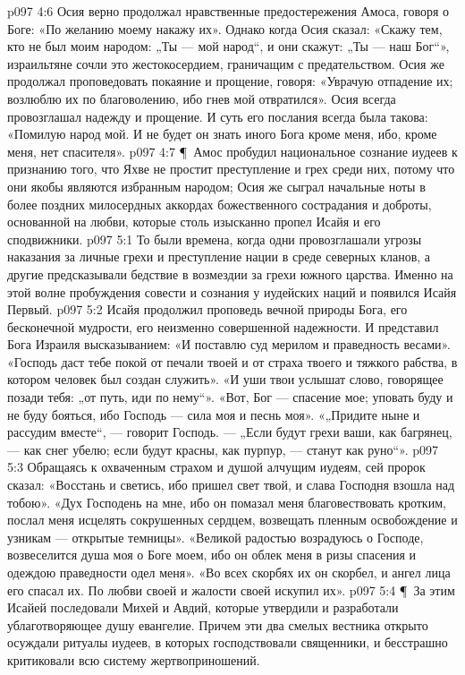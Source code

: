 \vs p097 4:6 Осия верно продолжал нравственные предостережения Амоса, говоря о Боге: «По желанию моему накажу их». Однако когда Осия сказал: «Скажу тем, кто не был моим народом: „Ты --- мой народ“, и они скажут: „Ты --- наш Бог“», израильтяне сочли это жестокосердием, граничащим с предательством. Осия же продолжал проповедовать покаяние и прощение, говоря: «Уврачую отпадение их; возлюблю их по благоволению, ибо гнев мой отвратился». Осия всегда провозглашал надежду и прощение. И суть его послания всегда была такова: «Помилую народ мой. И не будет он знать иного Бога кроме меня, ибо, кроме меня, нет спасителя».
\vs p097 4:7 \P\ Амос пробудил национальное сознание иудеев к признанию того, что Яхве не простит преступление и грех среди них, потому что они якобы являются избранным народом; Осия же сыграл начальные ноты в более поздних милосердных аккордах божественного сострадания и доброты, основанной на любви, которые столь изысканно пропел Исайя и его сподвижники.
\vs p097 5:1 То были времена, когда одни провозглашали угрозы наказания за личные грехи и преступление нации в среде северных кланов, а другие предсказывали бедствие в возмездии за грехи южного царства. Именно на этой волне пробуждения совести и сознания у иудейских наций и появился Исайя Первый.
\vs p097 5:2 Исайя продолжил проповедь вечной природы Бога, его бесконечной мудрости, его неизменно совершенной надежности. И представил Бога Израиля высказыванием: «И поставлю суд мерилом и праведность весами». «Господь даст тебе покой от печали твоей и от страха твоего и тяжкого рабства, в котором человек был создан служить». «И уши твои услышат слово, говорящее позади тебя: „от путь, иди по нему“». «Вот, Бог --- спасение мое; уповать буду и не буду бояться, ибо Господь --- сила моя и песнь моя». «„Придите ныне и рассудим вместе“, --- говорит Господь. --- „Если будут грехи ваши, как багрянец, --- как снег убелю; если будут красны, как пурпур, --- станут как руно“».
\vs p097 5:3 Обращаясь к охваченным страхом и душой алчущим иудеям, сей пророк сказал: «Восстань и светись, ибо пришел свет твой, и слава Господня взошла над тобою». «Дух Господень на мне, ибо он помазал меня благовествовать кротким, послал меня исцелять сокрушенных сердцем, возвещать пленным освобождение и узникам --- открытые темницы». «Великой радостью возрадуюсь о Господе, возвеселится душа моя о Боге моем, ибо он облек меня в ризы спасения и одеждою праведности одел меня». «Во всех скорбях их он скорбел, и ангел лица его спасал их. По любви своей и жалости своей искупил их».
\vs p097 5:4 \P\ За этим Исайей последовали Михей и Авдий, которые утвердили и разработали ублаготворяющее душу евангелие. Причем эти два смелых вестника открыто осуждали ритуалы иудеев, в которых господствовали священники, и бесстрашно критиковали всю систему жертвоприношений.
